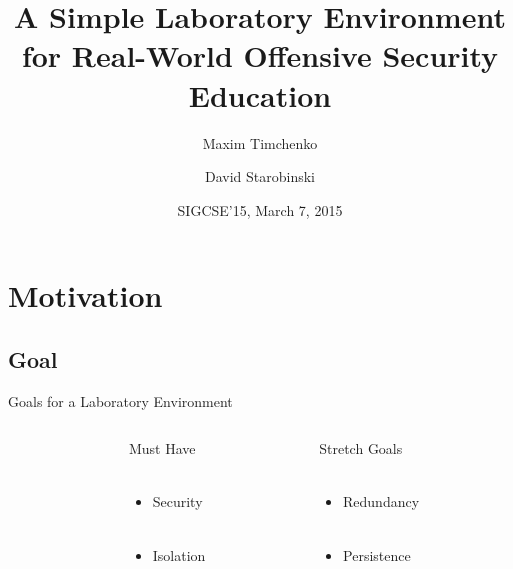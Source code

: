 \documentclass{beamer}
\title{A Simple Laboratory Environment \\for Real-World Offensive Security Education}
\author{Maxim Timchenko \and David Starobinski}
\institute{Electrical and Computer Engineering Department\\Boston University}
\date{SIGCSE'15, March 7, 2015}
\begin{document}
	\begin{frame}
		\titlepage
	\end{frame}
	
	\section{Motivation}
	\subsection{Goal}
	
	\begin{frame}{Goals for a Laboratory Environment}
		\begin{center}
    		\begin{columns}[t]
		\begin{column}{0.1\textwidth}
		~
		\end{column}
     		\begin{column}{0.4\textwidth}
            		Must Have\\~
            		\begin{itemize}
            			\item Security\\~
            			\item Isolation
            		\end{itemize}		
      		\end{column}
    
    		\begin{column}{0.4\textwidth}
            		Stretch Goals\\~
            		\begin{itemize}
            			\item Redundancy\\~
            			\item Persistence
            		\end{itemize}		
      		\end{column}
    		\end{columns}			
		\end{center}
	\end{frame}
\end{document}
